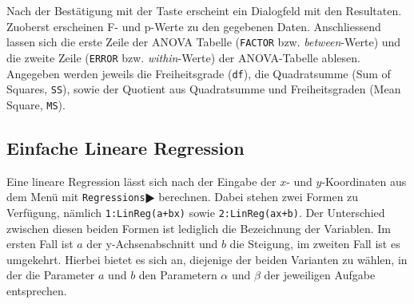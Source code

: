 \documentclass[a4paper,11pt,notitlepage,halfparskip,headsepline,normalheadings,twoside]{scrartcl}
\newlength{\tikey}
\newcommand{\keystroke}[1]{\settowidth{\tikey}{\scriptsize #1}\psframebox[framearc=0.2]{\parbox{\tikey}{\scriptsize\textsf{#1}}}}
\begin{document}
\begin{window}
Nach der Bestätigung mit der Taste \keystroke{ENTER} erscheint ein Dialogfeld
mit den Resultaten. Zuoberst erscheinen F- und p-Werte zu den gegebenen
Daten. Anschliessend lassen sich die erste Zeile der ANOVA Tabelle
(\texttt{FACTOR} bzw. \textit{between}-Werte) und die
zweite Zeile (\texttt{ERROR} bzw. \textit{within}-Werte) der ANOVA-Tabelle ablesen. Angegeben werden
jeweils die Freiheitsgrade (\texttt{df}), die Quadratsumme (Sum of Squares,
\texttt{SS}), sowie der Quotient aus Quadratsumme und Freiheitsgraden (Mean
Square, \texttt{MS}).
\end{window}

\subsection{Einfache Lineare Regression}
\begin{window}
Eine lineare Regression lässt sich nach der Eingabe der $x$- und $y$-Koordinaten
aus dem Menü \keystroke{F4} mit \texttt{Regressions$\RHD$}
berechnen. Dabei stehen zwei Formen zu Verfügung, nämlich
\texttt{1:LinReg(a+bx)} sowie \texttt{2:LinReg(ax+b)}. Der Unterschied zwischen
diesen beiden Formen ist lediglich die Bezeichnung der Variablen. Im ersten Fall
ist $a$ der y-Achsenabschnitt und $b$ die Steigung, im zweiten Fall ist es
umgekehrt. Hierbei bietet es sich an, diejenige der beiden Varianten zu wählen, in der die Parameter $a$ und $b$ den Parametern
$\alpha$ und $\beta$ der jeweiligen Aufgabe entsprechen.
\end{window}
\end{document}
